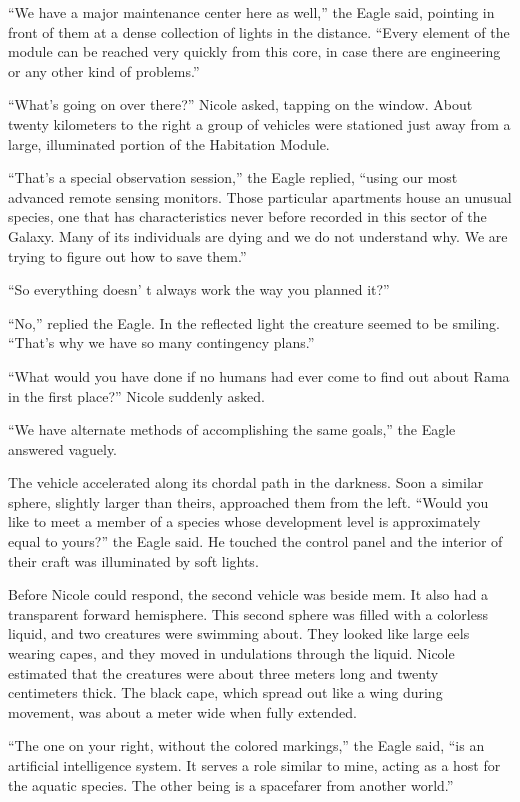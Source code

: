 \documentclass[]{article}
\begin{document}
{“We have a major maintenance center here as well,” the Eagle said, pointing in front of them at a dense collection of lights in the distance.  “Every element of the module can be reached very quickly from this core, in case there are engineering or any other kind of problems.”

“What’s going on over there?” Nicole asked, tapping on the window.  About twenty kilometers to the right a group of vehicles were stationed just away from a large, illuminated portion of the Habitation Module.

“That’s a special observation session,” the Eagle replied, “using our most advanced remote sensing monitors.  Those particular apartments house an unusual species, one that has characteristics never before recorded in this sector of the Galaxy.  Many of its individuals are dying and we do not understand why.  We are trying to figure out how to save them.”

“So everything doesn’ t always work the way you planned it?”

“No,” replied the Eagle.  In the reflected light the creature seemed to be smiling.  “That’s why we have so many contingency plans.”

“What would you have done if no humans had ever come to find out about Rama in the first place?” Nicole suddenly asked.

“We have alternate methods of accomplishing the same goals,” the Eagle answered vaguely.

The vehicle accelerated along its chordal path in the darkness.  Soon a similar sphere, slightly larger than theirs, approached them from the left.  “Would you like to meet a member of a species whose development level is approximately equal to yours?” the Eagle said.  He touched the control panel and the interior of their craft was illuminated by soft lights.

Before Nicole could respond, the second vehicle was beside mem.  It also had a transparent forward hemisphere.  This second sphere was filled with a colorless liquid, and two creatures were swimming about.  They looked like large eels wearing capes, and they moved in undulations through the liquid.  Nicole estimated that the creatures were about three meters long and twenty centimeters thick.  The black cape, which spread out like a wing during movement, was about a meter wide when fully extended.

“The one on your right, without the colored markings,” the Eagle said, “is an artificial intelligence system.  It serves a role similar to mine, acting as a host for the aquatic species.  The other being is a spacefarer from another world.”

}
\end{document}

